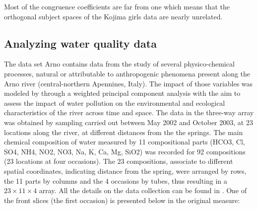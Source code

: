 \documentclass[article,shortnames, nojss]{jss}
\begin{document}
Most of the congruence coefficients are far from one
which means that the orthogonal subject spaces of
the Kojima girls data are nearly unrelated.
\subsection{Analyzing water quality data}
\label{sec:ex-arno}

The data set Arno contains data from the study of several physico-chemical processes,
natural or attributable to anthropogenic phenomena present along the Arno
river (central-northern Apennines, Italy). The impact of those variables
was modeled by \cite{gallo-buccianti:2013} through a weighted principal
component analysis with the aim to assess the impact of water
pollution on the environmental and ecological characteristics
of the river across time and space.
The data in the three-way array was obtained by sampling carried out
between May 2002 and October 2003, at 23 locations along
the river, at different distances from the the springs. The main
chemical composition of water measured by 11 compositional parts
(HCO3, Cl, SO4, NH4, NO2, NO3, Na, K, Ca, Mg, SiO2) was recorded
for 92 compositions (23 locations at four occasions). The 23
compositions, associate to different spatial coordinates,
indicating distance from the spring, were arranged by rows,
the 11 parts by columns and the 4 occasions by tubes, thus
resulting in a $23 \times 11 \times 4$ array. All the details
on the data collection can be found in \cite{gallo-buccianti:2013}.
One of the front slices (the first occasion) is presented below in the original measure:
\footnotesize
\end{document}

